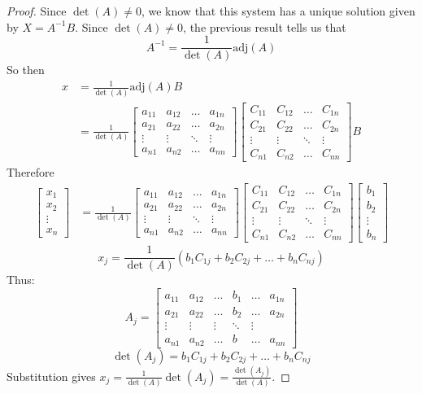 \documentclass[12pt]{article}
\begin{document}
\begin{proof} Since $\det(A) \neq 0$, we know that this system has a unique solution given by $X = A^{-1}B$. Since $\det(A) \neq 0$, the previous result tells us that $$A^{-1} = \frac{1}{\det(A)}\text{adj}(A)$$ So then $$ \begin{aligned} x &= \frac{1}{\det(A)}\text{adj}(A)B \\ &= \frac{1}{\det(A)} \begin{bmatrix} a_{11} & a_{12} & \dots & a_{1n} \\ a_{21} & a_{22} & \dots & a_{2n} \\ \vdots & \vdots & \ddots & \vdots \\ a_{n1} & a_{n2} & \dots & a_{nn} \end{bmatrix} \begin{bmatrix} C_{11} & C_{12} & \dots & C_{1n} \\ C_{21} & C_{22} & \dots & C_{2n} \\ \vdots & \vdots & \ddots & \vdots \\ C_{n1} & C_{n2} & \dots & C_{nn} \end{bmatrix} B \end{aligned} $$ Therefore $$ \begin{aligned} \begin{bmatrix} x_1 \\ x_2 \\ \vdots \\ x_n \end{bmatrix} &= \frac{1}{\det(A)} \begin{bmatrix} a_{11} & a_{12} & \dots & a_{1n} \\ a_{21} & a_{22} & \dots & a_{2n} \\ \vdots & \vdots & \ddots & \vdots \\ a_{n1} & a_{n2} & \dots & a_{nn} \end{bmatrix} \begin{bmatrix} C_{11} & C_{12} & \dots & C_{1n} \\ C_{21} & C_{22} & \dots & C_{2n} \\ \vdots & \vdots & \ddots & \vdots \\ C_{n1} & C_{n2} & \dots & C_{nn} \end{bmatrix} \begin{bmatrix} b_1 \\ b_2 \\ \vdots \\ b_n \end{bmatrix} \end{aligned} $$ $$x_j = \frac{1}{\det(A)}(b_1C_{1j} + b_2C_{2j} + \dots + b_nC_{nj})$$ Thus: $$ A_j = \begin{bmatrix} a_{11} & a_{12} & \dots & b_1 & \dots & a_{1n} \\ a_{21} & a_{22} & \dots & b_2 & \dots & a_{2n} \\ \vdots & \vdots & \vdots & \ddots & \vdots \\ a_{n1} & a_{n2} & \dots & b&  \dots & a_{nn} \end{bmatrix} $$ $$\det(A_j) = b_1C_{1j} + b_2C_{2j} + \dots + b_nC_{nj} $$ Substitution gives $ x_j = \frac{1}{\det(A)}\det(A_j) = \frac{\det(A_j)}{\det(A)} $. \end{proof} 
\end{document}
